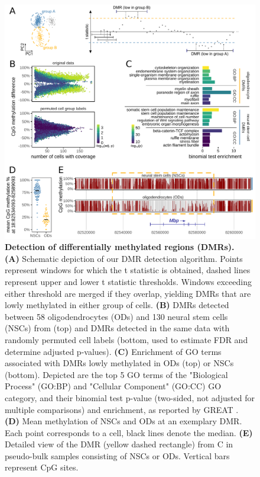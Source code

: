 \documentclass[10pt]{article}
\begin{document}
\begin{figure}[p]
	\begin{center}
		\includegraphics[width=.8\textwidth]{figures/Fig_DMRs.pdf}
	\end{center}
	\caption{\small \textbf{Detection of differentially methylated regions (DMRs).}\\
		\textbf{(A)} Schematic depiction of our DMR detection algorithm.
		Points represent windows for which the t statistic is obtained, dashed lines represent upper and lower t statistic thresholds.
		Windows exceeding either threshold are merged if they overlap, yielding DMRs that are lowly methylated in either group of cells.
		\textbf{(B)} DMRs detected between 58 oligodendrocytes (ODs) and 130 neural stem cells (NSCs) from \citet{kremer_scnmt} (top) and DMRs detected in the same data with randomly permuted cell labels (bottom, used to estimate FDR and determine adjusted p-values).
		\textbf{(C)} Enrichment of GO terms associated with DMRs lowly methylated in ODs (top) or NSCs (bottom).
		Depicted are the top 5 GO terms of the "Biological Process" (GO:BP) and "Cellular Component" (GO:CC) GO category, and their binomial test p-value (two-sided, not adjusted for multiple comparisons) and enrichment, as reported by GREAT \citep{mclean2010great}.
		\textbf{(D)} Mean methylation of NSCs and ODs at an exemplary DMR.
		Each point corresponds to a cell, black lines denote the median.
		\textbf{(E)} Detailed view of the DMR (yellow dashed rectangle) from C in pseudo-bulk samples consisting of NSCs or ODs.
		Vertical bars represent CpG sites.
	}
	\label{fig:dmr}
\end{figure}
\end{document}
